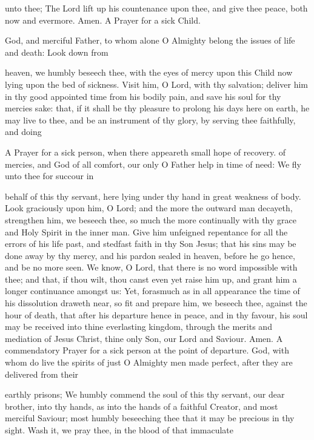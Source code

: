 unto thee; The Lord lift up his countenance upon thee, and give thee peace, both now and evermore. Amen. A Prayer for a sick Child.

God, and merciful Father, to whom alone O Almighty belong the issues of life and death: Look down from

heaven, we humbly beseech thee, with the eyes of mercy upon this Child now lying upon the bed of sickness. Visit him, O Lord, with thy salvation; deliver him in thy good appointed time from his bodily pain, and save his soul for thy mercies sake: that, if it shall be thy pleasure to prolong his days here on earth, he may live to thee, and be an instrument of thy glory, by serving thee faithfully, and doing

A Prayer for a sick person, when there appeareth small hope of recovery. of mercies, and God of all comfort, our only O Father help in time of need: We fly unto thee for succour in

behalf of this thy servant, here lying under thy hand in great weakness of body. Look graciously upon him, O Lord; and the more the outward man decayeth, strengthen him, we beseech thee, so much the more continually with thy grace and Holy Spirit in the inner man. Give him unfeigned repentance for all the errors of his life past, and stedfast faith in thy Son Jesus; that his sins may be done away by thy mercy, and his pardon sealed in heaven, before he go hence, and be no more seen. We know, O Lord, that there is no word impossible with thee; and that, if thou wilt, thou canst even yet raise him up, and grant him a longer continuance amongst us: Yet, forasmuch as in all appearance the time of his dissolution draweth near, so fit and prepare him, we beseech thee, against the hour of death, that after his departure hence in peace, and in thy favour, his soul may be received into thine everlasting kingdom, through the merits and mediation of Jesus Christ, thine only Son, our Lord and Saviour. Amen. A commendatory Prayer for a sick person at the point of departure. God, with whom do live the spirits of just O Almighty men made perfect, after they are delivered from their

earthly prisons; We humbly commend the soul of this thy servant, our dear brother, into thy hands, as into the hands of a faithful Creator, and most merciful Saviour; most humbly beseeching thee that it may be precious in thy sight. Wash it, we pray thee, in the blood of that immaculate

